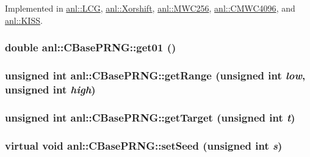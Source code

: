 Implemented in \hyperlink{classanl_1_1LCG_a65cb6d076966f0a22afb66ef633166bf}{anl::LCG}, \hyperlink{classanl_1_1Xorshift_a4077fd48d3a6dd1a57a6aa3089441dd7}{anl::Xorshift}, \hyperlink{classanl_1_1MWC256_a7857a5fc425c176743a88062aeddbedf}{anl::MWC256}, \hyperlink{classanl_1_1CMWC4096_a28729ce8c6c8dab8cf551c7ddc2b751b}{anl::CMWC4096}, and \hyperlink{classanl_1_1KISS_a1025043c844dd93d33bedf412fef9cc3}{anl::KISS}.\hypertarget{classanl_1_1CBasePRNG_a82990127f6a4b9cee3b48861f622e4b3}{
\subsubsection[{get01}]{\setlength{\rightskip}{0pt plus 5cm}double anl::CBasePRNG::get01 ()}}
\label{classanl_1_1CBasePRNG_a82990127f6a4b9cee3b48861f622e4b3}
\hypertarget{classanl_1_1CBasePRNG_a6427bf7c28728bbe15077c34a2736dbd}{
\subsubsection[{getRange}]{\setlength{\rightskip}{0pt plus 5cm}unsigned int anl::CBasePRNG::getRange (unsigned int {\em low}, \/  unsigned int {\em high})}}
\label{classanl_1_1CBasePRNG_a6427bf7c28728bbe15077c34a2736dbd}
\hypertarget{classanl_1_1CBasePRNG_a78fb7f29598253f3eb1aaf0a9fc87058}{
\subsubsection[{getTarget}]{\setlength{\rightskip}{0pt plus 5cm}unsigned int anl::CBasePRNG::getTarget (unsigned int {\em t})}}
\label{classanl_1_1CBasePRNG_a78fb7f29598253f3eb1aaf0a9fc87058}
\hypertarget{classanl_1_1CBasePRNG_a6e9a81522fe055749739e4d79b5aa27e}{
\subsubsection[{setSeed}]{\setlength{\rightskip}{0pt plus 5cm}virtual void anl::CBasePRNG::setSeed (unsigned int {\em s})}}
\label{classanl_1_1CBasePRNG_a6e9a81522fe055749739e4d79b5aa27e}


